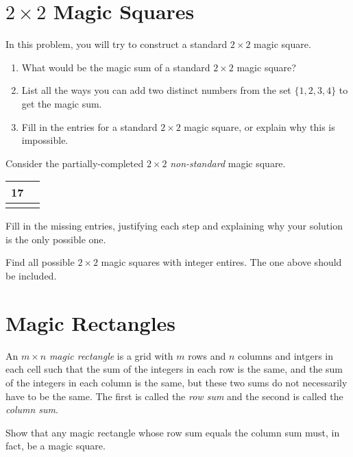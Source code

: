 \documentclass[11pt]{article}
\renewenvironment{problem}{\begin{problems}}{\end{problems}\vspace{5pt}}
\begin{document}
\section{$2 \times 2$ Magic Squares}

\begin{problem}[6=2+2+2 points]
In this problem, you will try to construct a standard $2 \times 2$ magic square.
\begin{enumerate}[label=(\alph*)]
\item What would be the magic sum of a standard $2 \times 2$ magic square?

\item List all the ways you can add two distinct numbers from the set $\{1, 2, 3, 4\}$ to get the magic sum.

\item Fill in the entries for a standard $2 \times 2$ magic square, or explain why this is impossible.
\end{enumerate}
\end{problem}

\begin{problem}[4 points]
Consider the partially-completed $2 \times 2$ \textit{non-standard} magic square.
\begin{center}
\begin{tabular}{|c|c|}
\hline
17 & \phantom{17} \\ \hline
 & \\ \hline
\end{tabular}
\end{center}
Fill in the missing entries, justifying each step and explaining why your solution is the only possible one.
\end{problem}

\begin{problem}[4 points]
Find all possible $2 \times 2$ magic squares with integer entires. The one above should be included.
\end{problem}

\section{Magic Rectangles}

\begin{definition}
An $m \times n$ \textit{magic rectangle} is a grid with $m$ rows and $n$ columns and intgers in each cell such that
the sum of the integers in each row is the same, and the sum of the integers in each column is the same,
but these two sums do not necessarily have to be the same.
The first is called the \textit{row sum} and the second is called the \textit{column sum}.
\end{definition}

\begin{problem}[3 points]
Show that any magic rectangle whose row sum equals the column sum must, in fact, be a magic square.
\end{problem}
\end{document}
